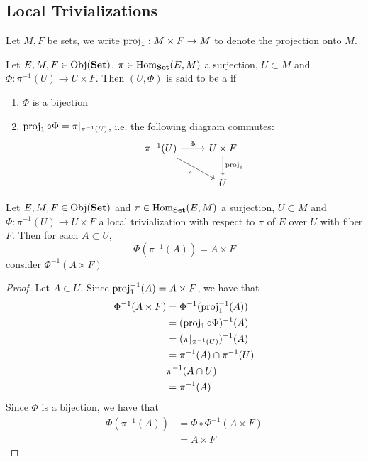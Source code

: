 \documentclass{book}
\begin{document}
	\subsection{Local Trivializations}
	
	\begin{note} 
		Let $M, F$ be sets, we write $\operatorname{\text{proj}}_1: M \times F \rightarrow M$ to denote the projection onto $M$.
	\end{note}

	\begin{defn} 
		Let $E, M, F \in \operatorname{Obj}(\operatorname*{\text{\textbf{Set}}})$, $\pi \in \operatorname{Hom}_{\operatorname*{\text{\textbf{Set}}}}(E, M)$ a surjection, $U \subset M$ and $\Phi: \pi^{-1}(U) \rightarrow U \times F$. Then $(U, \Phi)$ is said to be a   if 
		\begin{enumerate}
			\item $\Phi$ is a bijection
			\item $\operatorname{\text{proj}}_1 \circ \Phi = \pi|_{\pi^{-1}(U)}$, i.e. the following diagram commutes:
			\[ 
			\begin{tikzcd}
				\pi^{-1}(U) \arrow[r, "\Phi"] \arrow[dr, "\pi"'] & U \times F \arrow[d, "\prj_1"]  \\
				& U
			\end{tikzcd}
			\]
		\end{enumerate}
	\end{defn}
	
	\begin{ex} 
		Let $E, M, F \in \operatorname{Obj}(\operatorname*{\text{\textbf{Set}}})$ and $\pi \in \operatorname{Hom}_{\operatorname*{\text{\textbf{Set}}}}(E, M)$ a surjection, $U \subset M$ and $\Phi: \pi^{-1}(U) \rightarrow U \times F$ a local trivialization with respect to $\pi$ of $E$ over $U$ with fiber $F$. Then for each $A \subset U$, $$\Phi( \pi^{-1}(A)) = A \times F$$
		 consider $\Phi^{-1}(A \times F)$ 
	\end{ex}
	
	\begin{proof}
		Let $A \subset U$. Since $\operatorname{\text{proj}}_1^{-1}(A) = A \times F$, we have that 
		\begin{align*}
			\Phi^{-1}(A \times F)
			& = \Phi^{-1}(\operatorname{\text{proj}}_1^{-1}(A)) \\
			& = (\operatorname{\text{proj}}_1 \circ \Phi)^{-1}(A) \\
			& = (\pi|_{\pi^{-1}(U)})^{-1}(A) \\
			& = \pi^{-1}(A) \cap \pi^{-1}(U) \\
			&  \pi^{-1}(A \cap U) \\
			& = \pi^{-1}(A)
		\end{align*}
		Since $\Phi$ is a bijection, we have that
		\begin{align*}
			\Phi (\pi^{-1}(A))
			&= \Phi \circ \Phi^{-1}(A \times F) \\
			&= A \times F
		\end{align*}
	\end{proof}
\end{document}
